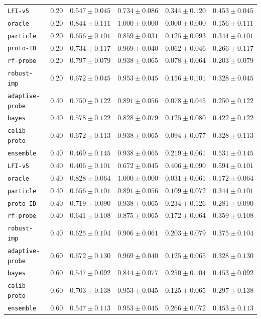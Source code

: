 \documentclass{article}
\begin{document}
\begin{center}
{\begin{tabular}{llcccc}
\texttt{LFI-v5} & 0.20 & $0.547 \pm 0.045$ & $0.734 \pm 0.086$ & $0.344 \pm 0.120$ & $0.453 \pm 0.045$ \\
\texttt{oracle} & 0.20 & $0.844 \pm 0.111$ & $1.000 \pm 0.000$ & $0.000 \pm 0.000$ & $0.156 \pm 0.111$ \\
\texttt{particle} & 0.20 & $0.656 \pm 0.101$ & $0.859 \pm 0.031$ & $0.125 \pm 0.093$ & $0.344 \pm 0.101$ \\
\texttt{proto-ID} & 0.20 & $0.734 \pm 0.117$ & $0.969 \pm 0.040$ & $0.062 \pm 0.046$ & $0.266 \pm 0.117$ \\
\texttt{rf-probe} & 0.20 & $0.797 \pm 0.079$ & $0.938 \pm 0.065$ & $0.078 \pm 0.064$ & $0.203 \pm 0.079$ \\
\texttt{robust-imp} & 0.20 & $0.672 \pm 0.045$ & $0.953 \pm 0.045$ & $0.156 \pm 0.101$ & $0.328 \pm 0.045$ \\
\texttt{adaptive-probe} & 0.40 & $0.750 \pm 0.122$ & $0.891 \pm 0.056$ & $0.078 \pm 0.045$ & $0.250 \pm 0.122$ \\
\texttt{bayes} & 0.40 & $0.578 \pm 0.122$ & $0.828 \pm 0.079$ & $0.125 \pm 0.080$ & $0.422 \pm 0.122$ \\
\texttt{calib-proto} & 0.40 & $0.672 \pm 0.113$ & $0.938 \pm 0.065$ & $0.094 \pm 0.077$ & $0.328 \pm 0.113$ \\
\texttt{ensemble} & 0.40 & $0.469 \pm 0.145$ & $0.938 \pm 0.065$ & $0.219 \pm 0.061$ & $0.531 \pm 0.145$ \\
\texttt{LFI-v5} & 0.40 & $0.406 \pm 0.101$ & $0.672 \pm 0.045$ & $0.406 \pm 0.090$ & $0.594 \pm 0.101$ \\
\texttt{oracle} & 0.40 & $0.828 \pm 0.064$ & $1.000 \pm 0.000$ & $0.031 \pm 0.061$ & $0.172 \pm 0.064$ \\
\texttt{particle} & 0.40 & $0.656 \pm 0.101$ & $0.891 \pm 0.056$ & $0.109 \pm 0.072$ & $0.344 \pm 0.101$ \\
\texttt{proto-ID} & 0.40 & $0.719 \pm 0.090$ & $0.938 \pm 0.065$ & $0.234 \pm 0.126$ & $0.281 \pm 0.090$ \\
\texttt{rf-probe} & 0.40 & $0.641 \pm 0.108$ & $0.875 \pm 0.065$ & $0.172 \pm 0.064$ & $0.359 \pm 0.108$ \\
\texttt{robust-imp} & 0.40 & $0.625 \pm 0.104$ & $0.906 \pm 0.061$ & $0.203 \pm 0.079$ & $0.375 \pm 0.104$ \\
\texttt{adaptive-probe} & 0.60 & $0.672 \pm 0.130$ & $0.969 \pm 0.040$ & $0.125 \pm 0.065$ & $0.328 \pm 0.130$ \\
\texttt{bayes} & 0.60 & $0.547 \pm 0.092$ & $0.844 \pm 0.077$ & $0.250 \pm 0.104$ & $0.453 \pm 0.092$ \\
\texttt{calib-proto} & 0.60 & $0.703 \pm 0.138$ & $0.953 \pm 0.045$ & $0.125 \pm 0.065$ & $0.297 \pm 0.138$ \\
\texttt{ensemble} & 0.60 & $0.547 \pm 0.113$ & $0.953 \pm 0.045$ & $0.266 \pm 0.072$ & $0.453 \pm 0.113$ \\
\bottomrule
\end{tabular}%
}
\end{center}
\end{document}
